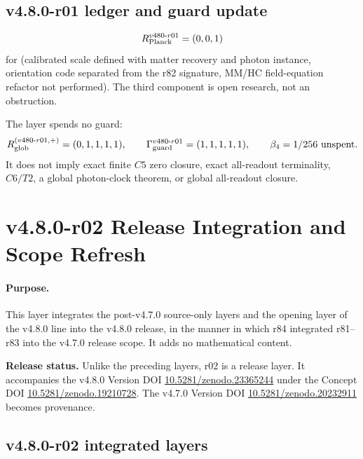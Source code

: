 \subsection*{v4.8.0-r01 ledger and guard update}
\label{subsec:v480-r01-ledger-guard}

\[
R_{\rm Planck}^{v480\text{-}r01}=(0,0,1)
\]
for (calibrated scale defined with matter recovery and photon instance, orientation code
separated from the r82 signature, MM/HC field-equation refactor not performed).  The third
component is open research, not an obstruction.

The layer spends no guard:
\[
R_{\rm glob}^{(v480\text{-}r01,+)}=(0,1,1,1,1),
\qquad
\Gamma_{\rm guard}^{v480\text{-}r01}=(1,1,1,1,1),
\qquad
\beta_4=1/256\ \text{unspent}.
\]
It does not imply exact finite \(C5\) zero closure, exact all-readout terminality,
\(C6/T2\), a global photon-clock theorem, or global all-readout closure.

\clearpage
\section*{v4.8.0-r02 Release Integration and Scope Refresh}
\label{sec:v480-r02-release-integration}

\paragraph{Purpose.}
This layer integrates the post-v4.7.0 source-only layers and the opening layer of the
v4.8.0 line into the v4.8.0 release, in the manner in which r84 integrated r81--r83 into the
v4.7.0 release scope.  It adds no mathematical content.

\noindent\textbf{Release status.}
Unlike the preceding layers, r02 is a release layer.  It accompanies the v4.8.0 Version DOI
\href{https://doi.org/10.5281/zenodo.23365244}{10.5281/zenodo.23365244} under the Concept DOI
\href{https://doi.org/10.5281/zenodo.19210728}{10.5281/zenodo.19210728}.  The v4.7.0 Version
DOI \href{https://doi.org/10.5281/zenodo.20232911}{10.5281/zenodo.20232911} becomes provenance.

\subsection*{v4.8.0-r02 integrated layers}
\label{subsec:v480-r02-integrated-layers}

